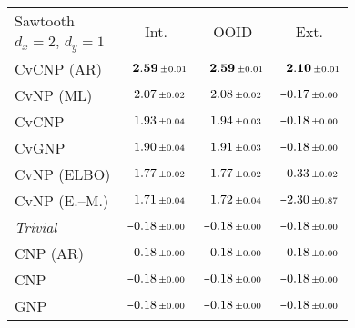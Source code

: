 \begin{tabular}[t]{lccc} 
\toprule 
Sawtooth & \multirow{2}{*}{Int.} & \multirow{2}{*}{OOID} & \multirow{2}{*}{Ext.} \\ 
$d_x\!=\!2,\,d_y\!=\!1$ \\ \midrule 
CvCNP (AR) & $\hphantom{\scalebox{0.7}[1]{$-$}}\mathbf{2.59}\,{ \scriptstyle \pm  0.01 }$ & $\hphantom{\scalebox{0.7}[1]{$-$}}\mathbf{2.59}\,{ \scriptstyle \pm  0.01 }$ & $\hphantom{\scalebox{0.7}[1]{$-$}}\mathbf{2.10}\,{ \scriptstyle \pm  0.01 }$ \\ 
CvNP (ML) & $\hphantom{\scalebox{0.7}[1]{$-$}}2.07\,{ \scriptstyle \pm  0.02 }$ & $\hphantom{\scalebox{0.7}[1]{$-$}}2.08\,{ \scriptstyle \pm  0.02 }$ & $\scalebox{0.7}[1]{$-$}0.17\,{ \scriptstyle \pm  0.00 }$ \\ 
CvCNP & $\hphantom{\scalebox{0.7}[1]{$-$}}1.93\,{ \scriptstyle \pm  0.04 }$ & $\hphantom{\scalebox{0.7}[1]{$-$}}1.94\,{ \scriptstyle \pm  0.03 }$ & $\scalebox{0.7}[1]{$-$}0.18\,{ \scriptstyle \pm  0.00 }$ \\ 
CvGNP & $\hphantom{\scalebox{0.7}[1]{$-$}}1.90\,{ \scriptstyle \pm  0.04 }$ & $\hphantom{\scalebox{0.7}[1]{$-$}}1.91\,{ \scriptstyle \pm  0.03 }$ & $\scalebox{0.7}[1]{$-$}0.18\,{ \scriptstyle \pm  0.00 }$ \\ 
CvNP (ELBO) & $\hphantom{\scalebox{0.7}[1]{$-$}}1.77\,{ \scriptstyle \pm  0.02 }$ & $\hphantom{\scalebox{0.7}[1]{$-$}}1.77\,{ \scriptstyle \pm  0.02 }$ & $\hphantom{\scalebox{0.7}[1]{$-$}}0.33\,{ \scriptstyle \pm  0.02 }$ \\ 
CvNP (E.--M.) & $\hphantom{\scalebox{0.7}[1]{$-$}}1.71\,{ \scriptstyle \pm  0.04 }$ & $\hphantom{\scalebox{0.7}[1]{$-$}}1.72\,{ \scriptstyle \pm  0.04 }$ & $\scalebox{0.7}[1]{$-$}2.30\,{ \scriptstyle \pm  0.87 }$ \\ 
{\normalshape \textit{Trivial}} & $\scalebox{0.7}[1]{$-$}0.18\,{ \scriptstyle \pm  0.00 }$ & $\scalebox{0.7}[1]{$-$}0.18\,{ \scriptstyle \pm  0.00 }$ & $\scalebox{0.7}[1]{$-$}0.18\,{ \scriptstyle \pm  0.00 }$ \\ 
CNP (AR) & $\scalebox{0.7}[1]{$-$}0.18\,{ \scriptstyle \pm  0.00 }$ & $\scalebox{0.7}[1]{$-$}0.18\,{ \scriptstyle \pm  0.00 }$ & $\scalebox{0.7}[1]{$-$}0.18\,{ \scriptstyle \pm  0.00 }$ \\ 
CNP & $\scalebox{0.7}[1]{$-$}0.18\,{ \scriptstyle \pm  0.00 }$ & $\scalebox{0.7}[1]{$-$}0.18\,{ \scriptstyle \pm  0.00 }$ & $\scalebox{0.7}[1]{$-$}0.18\,{ \scriptstyle \pm  0.00 }$ \\ 
GNP & $\scalebox{0.7}[1]{$-$}0.18\,{ \scriptstyle \pm  0.00 }$ & $\scalebox{0.7}[1]{$-$}0.18\,{ \scriptstyle \pm  0.00 }$ & $\scalebox{0.7}[1]{$-$}0.18\,{ \scriptstyle \pm  0.00 }$ \\ 

\end{tabular}
